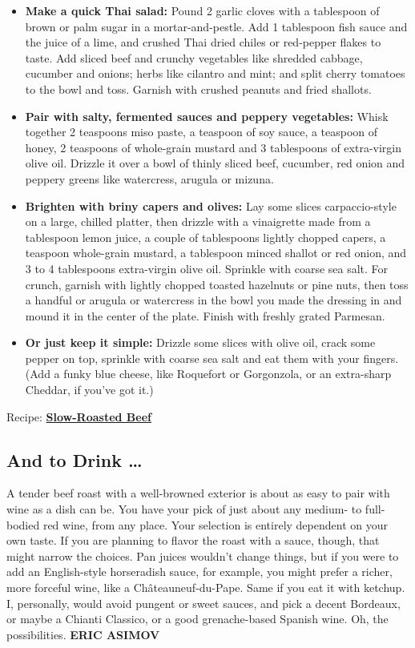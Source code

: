 \begin{itemize}
\item
  \textbf{Make a quick Thai salad:} Pound 2 garlic cloves with a
  tablespoon of brown or palm sugar in a mortar-and-pestle. Add 1
  tablespoon fish sauce and the juice of a lime, and crushed Thai dried
  chiles or red-pepper flakes to taste. Add sliced beef and crunchy
  vegetables like shredded cabbage, cucumber and onions; herbs like
  cilantro and mint; and split cherry tomatoes to the bowl and toss.
  Garnish with crushed peanuts and fried shallots.
\item
  \textbf{Pair with salty, fermented sauces and peppery vegetables:}
  Whisk together 2 teaspoons miso paste, a teaspoon of soy sauce, a
  teaspoon of honey, 2 teaspoons of whole-grain mustard and 3
  tablespoons of extra-virgin olive oil. Drizzle it over a bowl of
  thinly sliced beef, cucumber, red onion and peppery greens like
  watercress, arugula or mizuna.
\item
  \textbf{Brighten with briny capers and olives:} Lay some slices
  carpaccio-style on a large, chilled platter, then drizzle with a
  vinaigrette made from a tablespoon lemon juice, a couple of
  tablespoons lightly chopped capers, a teaspoon whole-grain mustard, a
  tablespoon minced shallot or red onion, and 3 to 4 tablespoons
  extra-virgin olive oil. Sprinkle with coarse sea salt. For crunch,
  garnish with lightly chopped toasted hazelnuts or pine nuts, then toss
  a handful or arugula or watercress in the bowl you made the dressing
  in and mound it in the center of the plate. Finish with freshly grated
  Parmesan.
\item
  \textbf{Or just keep it simple:} Drizzle some slices with olive oil,
  crack some pepper on top, sprinkle with coarse sea salt and eat them
  with your fingers. (Add a funky blue cheese, like Roquefort or
  Gorgonzola, or an extra-sharp Cheddar, if you've got it.)
\end{itemize}

Recipe:
\textbf{\href{https://cooking.nytimes3xbfgragh.onion/recipes/1021032-slow-roasted-beef}{Slow-Roasted
Beef}}

\hypertarget{and-to-drink-}{%
\subsection{And to Drink \ldots{}}\label{and-to-drink-}}

A tender beef roast with a well-browned exterior is about as easy to
pair with wine as a dish can be. You have your pick of just about any
medium- to full-bodied red wine, from any place. Your selection is
entirely dependent on your own taste. If you are planning to flavor the
roast with a sauce, though, that might narrow the choices. Pan juices
wouldn't change things, but if you were to add an English-style
horseradish sauce, for example, you might prefer a richer, more forceful
wine, like a Châteauneuf-du-Pape. Same if you eat it with ketchup. I,
personally, would avoid pungent or sweet sauces, and pick a decent
Bordeaux, or maybe a Chianti Classico, or a good grenache-based Spanish
wine. Oh, the possibilities. \textbf{ERIC ASIMOV}

